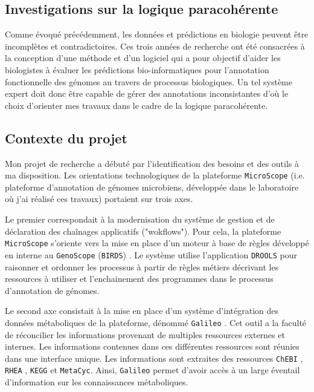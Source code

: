 \begin{refsegment}
\chapter{Investigations sur la logique paracohérente}

Comme évoqué précédemment, les données et prédictions en biologie peuvent être incomplètes et contradictoires. Ces trois années de recherche ont été consacrées à la conception d'une méthode et d'un logiciel qui a pour objectif d'aider les biologistes à évaluer les prédictions bio-informatiques pour l'annotation fonctionnelle des génomes au travers de processus biologiques. Un tel système expert doit donc être capable de gérer des annotations inconsistantes d'où le choix d'orienter mes travaux dans le cadre de la logique paracohérente.

\section{Contexte du projet}

Mon projet de recherche a débuté par l'identification des besoins et des outils à ma disposition. Les orientations technologiques de la plateforme \texttt{MicroScope} (i.e. plateforme d'annotation de génomes microbiens, développée dans le laboratoire où j'ai réalisé ces travaux) portaient sur trois axes.

Le premier correspondait à la modernisation du système de gestion et de déclaration des chaînages applicatifs ("wokflows"). Pour cela, la plateforme \texttt{MicroScope} s'oriente vers la mise en place d'un moteur à base de règles développé en interne au \texttt{GenoScope} (\texttt{\gls{BIRDS}}) . Le système utilise l'application \texttt{DROOLS}\cite{mcwhirter2001drools,browne2009jboss} pour raisonner et ordonner les processus à partir de règles métiers décrivant les ressources à utiliser et l'enchainement des programmes dans le processus d'annotation de génomes.

Le second axe consistait à la mise en place d'un système d'intégration des données métaboliques de la plateforme, dénommé \texttt{Galileo} \cite{galileo2014}. Cet outil a la faculté de réconcilier les informations provenant de multiples ressources externes et internes. Les informations contenues dans ces différentes ressources sont réunies dans une interface unique. Les informations sont extraites des ressources \texttt{ChEBI} \cite{hastings2013chebi}, \texttt{RHEA} \cite{alcantara2012rhea}, \texttt{KEGG} et \texttt{MetaCyc}. Ainsi, \texttt{Galileo} permet d'avoir accès à un large éventail d'information sur les connaissances métaboliques. 


\end{refsegment}
